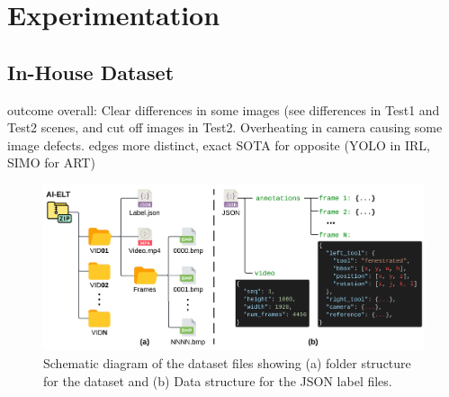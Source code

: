 \section{Experimentation}



\subsection{In-House Dataset}



outcome overall: Clear differences in some images (see differences in Test1 and Test2 scenes, and cut off images in Test2. Overheating in camera causing some image defects. edges more distinct, exact SOTA for opposite (YOLO in IRL, SIMO for ART)	 




\begin{figure}[htbp]
    \centering
    \includegraphics[width=\linewidth]{schematic_diagram.png}
    \caption{Schematic diagram of the dataset files showing (a) folder structure for the dataset and (b) Data structure for the JSON label files.}
    \label{fig:schematic_diagram}
\end{figure}

